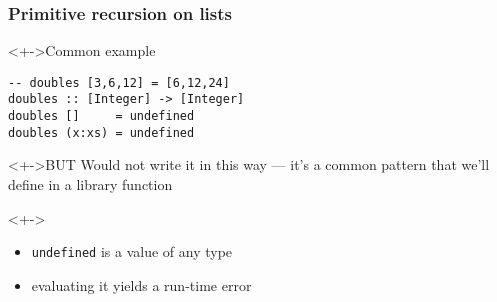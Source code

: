 \documentclass{beamer}
\begin{document}
\begin{frame}[fragile]
  \frametitle{Primitive recursion on lists}
  \begin{block}<+->{Common example}
\begin{verbatim}
-- doubles [3,6,12] = [6,12,24]
doubles :: [Integer] -> [Integer]
doubles []     = undefined
doubles (x:xs) = undefined
\end{verbatim}
  \end{block}
  \begin{alertblock}<+->{BUT}
    Would not write it in this way --- it's a common pattern that we'll define in a library function 
  \end{alertblock}
  \begin{alertblock}<+->{}
    \begin{itemize}
    \item \texttt{undefined} is a value of any type
    \item evaluating it yields a run-time error
    \end{itemize}
  \end{alertblock}
\end{frame}
\end{document}
